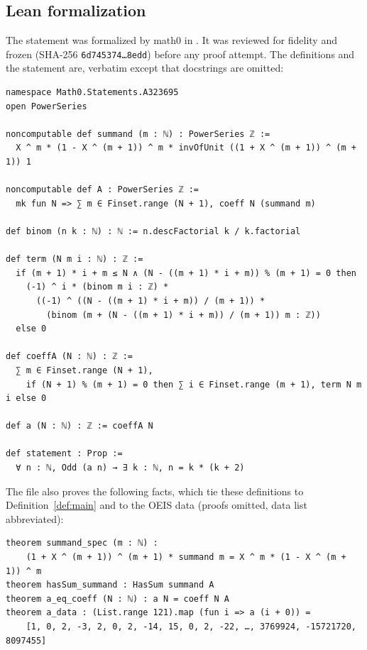 \documentclass[11pt]{amsart}
\theoremstyle{plain}
\theoremstyle{definition}
\begin{document}
\subsection*{Lean formalization}
The statement was formalized by math0 in . It was reviewed for fidelity and frozen (SHA-256 \texttt{6d745374\ldots 8edd}) before any proof attempt. The definitions and the statement are, verbatim except that docstrings are omitted:
\begin{lstlisting}
namespace Math0.Statements.A323695
open PowerSeries

noncomputable def summand (m : ℕ) : PowerSeries ℤ :=
  X ^ m * (1 - X ^ (m + 1)) ^ m * invOfUnit ((1 + X ^ (m + 1)) ^ (m + 1)) 1

noncomputable def A : PowerSeries ℤ :=
  mk fun N => ∑ m ∈ Finset.range (N + 1), coeff N (summand m)

def binom (n k : ℕ) : ℕ := n.descFactorial k / k.factorial

def term (N m i : ℕ) : ℤ :=
  if (m + 1) * i + m ≤ N ∧ (N - ((m + 1) * i + m)) % (m + 1) = 0 then
    (-1) ^ i * (binom m i : ℤ) *
      ((-1) ^ ((N - ((m + 1) * i + m)) / (m + 1)) *
        (binom (m + (N - ((m + 1) * i + m)) / (m + 1)) m : ℤ))
  else 0

def coeffA (N : ℕ) : ℤ :=
  ∑ m ∈ Finset.range (N + 1),
    if (N + 1) % (m + 1) = 0 then ∑ i ∈ Finset.range (m + 1), term N m i else 0

def a (N : ℕ) : ℤ := coeffA N

def statement : Prop :=
  ∀ n : ℕ, Odd (a n) → ∃ k : ℕ, n = k * (k + 2)
\end{lstlisting}
The file also proves the following facts, which tie these definitions to Definition~\ref{def:main} and to the OEIS data (proofs omitted, data list abbreviated):
\begin{lstlisting}
theorem summand_spec (m : ℕ) :
    (1 + X ^ (m + 1)) ^ (m + 1) * summand m = X ^ m * (1 - X ^ (m + 1)) ^ m
theorem hasSum_summand : HasSum summand A
theorem a_eq_coeff (N : ℕ) : a N = coeff N A
theorem a_data : (List.range 121).map (fun i => a (i + 0)) =
    [1, 0, 2, -3, 2, 0, 2, -14, 15, 0, 2, -22, …, 3769924, -15721720, 8097455]
\end{lstlisting}
\end{document}

